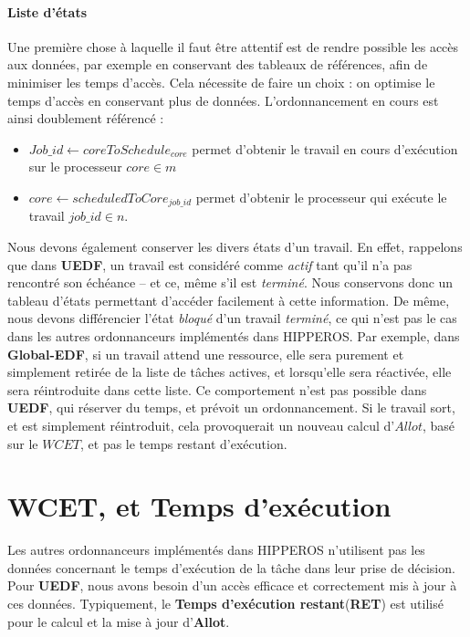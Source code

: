 		\paragraph{Liste d'états}
		Une première chose à laquelle il faut être attentif est de rendre possible les accès 
		aux données, par exemple en conservant des tableaux de références, afin de minimiser les temps 
		d'accès. Cela nécessite de faire un choix : on optimise le temps d'accès en conservant plus de données. 
		L'ordonnancement en cours est ainsi doublement référencé : 
		\begin{itemize}
			\setlength\itemsep{0.1em}
			\item $Job\_id \leftarrow coreToSchedule_{core}$ permet d'obtenir le travail en cours d'exécution sur le processeur $core \in m$
			\item $core \leftarrow scheduledToCore_{job\_id}$ permet d'obtenir le processeur qui exécute le travail $job\_id \in n$.
		\end{itemize}

		Nous devons également conserver les divers états d'un travail. En effet, rappelons que dans \textbf{UEDF}, 
		un travail est considéré comme \textit{actif} tant qu'il n'a pas rencontré son échéance -- et ce, 
		même s'il est \textit{terminé}. Nous conservons donc un tableau d'états permettant 
		d'accéder facilement à cette information.
		De même, nous devons différencier l'état \textit{bloqué} d'un travail \textit{terminé}, ce qui n'est pas le cas 
		dans les autres ordonnanceurs implémentés dans HIPPEROS. Par exemple, dans \textbf{Global-EDF}, si un travail 
		attend une ressource, elle sera purement et simplement retirée de la liste de tâches actives, et lorsqu'elle 
		sera réactivée, elle sera réintroduite dans cette liste. Ce comportement n'est pas possible dans \textbf{UEDF}, 
		qui \og{}réserver\fg{} du temps, et \og{}prévoit\fg{} un ordonnancement. Si le travail sort, et est simplement 
		réintroduit, cela provoquerait un nouveau calcul d'$Allot$, basé sur le $WCET$, et pas le temps restant d'exécution.
		
	\section{WCET, et Temps d'exécution}
		
		Les autres ordonnanceurs implémentés dans HIPPEROS n'utilisent pas les données concernant le temps 
		d'exécution de la tâche dans leur prise de décision. 
		Pour \textbf{UEDF}, nous avons besoin d'un accès efficace et correctement mis à jour à ces données. 
		Typiquement, le \textbf{Temps d'exécution restant}(\textbf{RET}) est utilisé pour le calcul et la mise à jour 
		d'\textbf{Allot}.\newline
		
